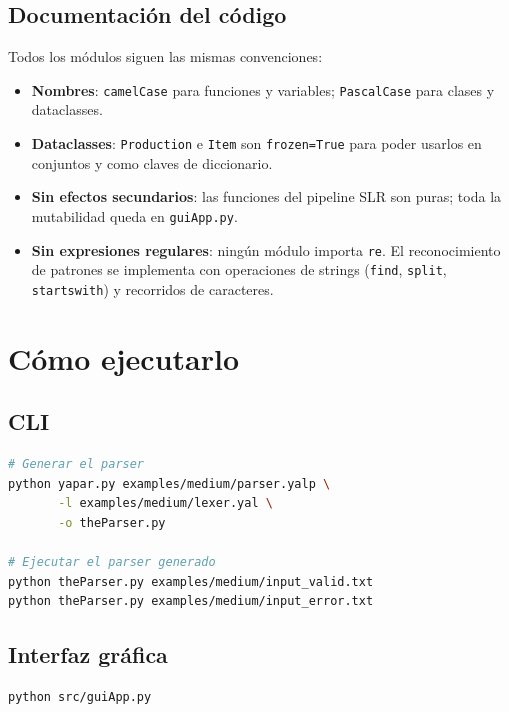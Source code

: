 \documentclass[11pt,a4paper]{article}
\begin{document}
\subsection{Documentación del código}

Todos los módulos siguen las mismas convenciones:

\begin{itemize}[noitemsep]
  \item \textbf{Nombres}: \texttt{camelCase} para funciones y variables;
        \texttt{PascalCase} para clases y dataclasses.
  \item \textbf{Dataclasses}: \texttt{Production} e \texttt{Item} son
        \texttt{frozen=True} para poder usarlos en conjuntos y como claves
        de diccionario.
  \item \textbf{Sin efectos secundarios}: las funciones del pipeline SLR son
        puras; toda la mutabilidad queda en \texttt{guiApp.py}.
  \item \textbf{Sin expresiones regulares}: ningún módulo importa \texttt{re}.
        El reconocimiento de patrones se implementa con operaciones de strings
        (\texttt{find}, \texttt{split}, \texttt{startswith}) y recorridos de
        caracteres.
\end{itemize}

\section{Cómo ejecutarlo}

\subsection{CLI}

\begin{lstlisting}[language=bash]
# Generar el parser
python yapar.py examples/medium/parser.yalp \
       -l examples/medium/lexer.yal \
       -o theParser.py

# Ejecutar el parser generado
python theParser.py examples/medium/input_valid.txt
python theParser.py examples/medium/input_error.txt
\end{lstlisting}

\subsection{Interfaz gráfica}

\begin{lstlisting}[language=bash]
python src/guiApp.py
\end{lstlisting}
\end{document}
